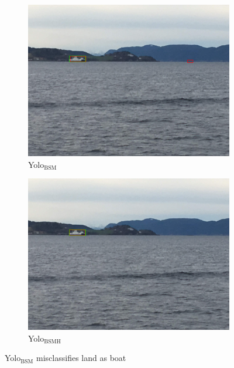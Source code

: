 \begin{figure}[h!]
\begin{subfigure}{.5\textwidth}
  \centering
  \includegraphics[width=0.8\linewidth]{results/case_buildings/yolotrf/Yolo2/IMG_2300.jpg}
  \caption{Yolo$_{\text{BSM}}$}
\end{subfigure}%
\begin{subfigure}{.5\textwidth}
  \centering
  \includegraphics[width=.8\linewidth]{results/case_buildings/yolotrf/Yolo3/IMG_2300.jpg}
  \caption{Yolo$_{\text{BSMH}}$}
\end{subfigure}
\caption{Yolo$_{\text{BSM}}$ misclassifies land as boat}
\label{fig:yolo2_misclassify}
\end{figure}

